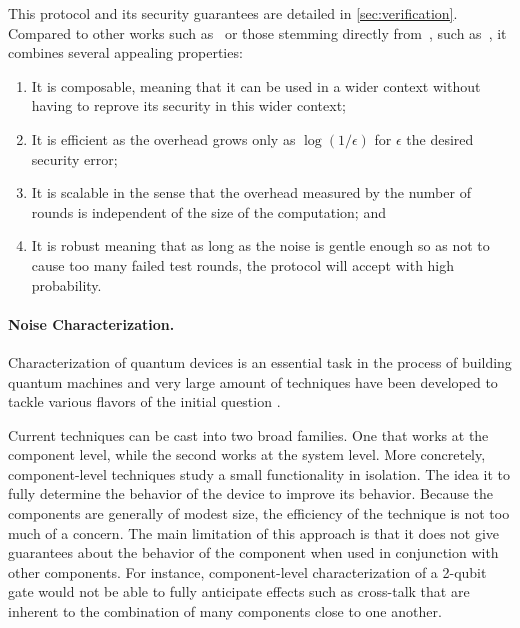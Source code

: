 This protocol and its security guarantees are detailed in \cref{sec:verification}. Compared to other works such as~\cite{ABE10interactive, ABEM17interactive, B18how} or those stemming directly from~\cite{FK17unconditionally}, such as~\cite{KW17optimised}, it combines several appealing properties:
\begin{enumerate}
\item It is composable, meaning that it can be used in a wider context without having to reprove its security in this wider context;
\item It is efficient as the overhead grows only as \(\log(1/\epsilon)\) for \(\epsilon\) the desired security error;
\item It is scalable in the sense that the overhead measured by the number of rounds is independent of the size of the computation; and
\item It is robust meaning that as long as the noise is gentle enough so as not to cause too many failed test rounds, the protocol will accept with high probability. 
\end{enumerate}   

\paragraph{Noise Characterization.}
Characterization of quantum devices is an essential task in the process of building quantum machines and very large amount of techniques have been developed to tackle various flavors of the initial question \cite{Wallman2016NoiseTailoringRandomizedCompiling}.

Current techniques can be cast into two broad families. One that works at the component level, while the second works at the system level. More concretely, component-level techniques study a small functionality in isolation. The idea it to fully determine the behavior of the device to improve its behavior. Because the components are generally of modest size, the efficiency of the technique is not too much of a concern. The main limitation of this approach is that it does not give guarantees about the behavior of the component when used in conjunction with other components. For instance, component-level characterization of a 2-qubit gate would not be able to fully anticipate effects such as cross-talk that are inherent to the combination of many components close to one another.

